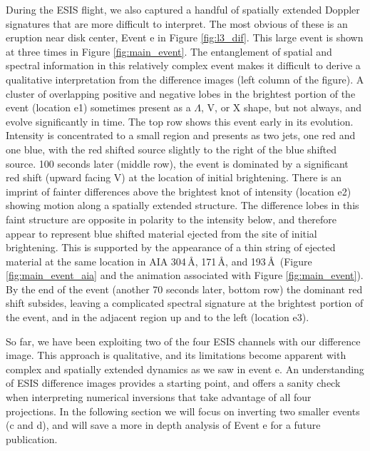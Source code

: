 \documentclass[linenumbers,trackchanges]{aastex63}
\begin{document}
    	During the ESIS flight, we also captured a handful of spatially extended Doppler signatures that are more difficult to interpret.
    	The most obvious of these is an eruption near disk center, Event e in Figure \ref{fig:l3_dif}.
    	This large event is shown at three times in Figure \ref{fig:main_event}.
    	The entanglement of spatial and spectral information in this relatively complex event makes it difficult to derive a qualitative interpretation from the difference images (left column of the figure).
    	A cluster of overlapping positive and negative lobes in the brightest portion of the event (location e1) sometimes present as a $\Lambda$, V, or X shape, but not always, and evolve significantly in time.
    	The top row shows this event early in its evolution. 
    	Intensity is concentrated to a small region and presents as two jets, one red and one blue, with the red shifted source slightly to the right of the blue shifted source. 
    	100 seconds later (middle row), the event is dominated by a significant red shift (upward facing V) at the location of initial brightening. 
    	There is an imprint of fainter differences above the brightest knot of intensity (location e2) showing motion along a spatially extended structure.
    	The difference lobes in this faint structure are opposite in polarity to the intensity below, and therefore appear to represent  blue shifted material ejected from the site of initial brightening.
    	This is supported by the appearance of a thin string of ejected material at the same location in AIA 304\,\AA, 171\,\AA, and 193\,\AA \ (Figure \ref{fig:main_event_aia} and the animation associated with Figure \ref{fig:main_event}).
    	By the end of the event (another 70 seconds later, bottom row) the dominant red shift subsides, leaving a complicated spectral signature at the brightest portion of the event, and in the adjacent region up and to the left (location e3).  
    	
    	So far, we have been exploiting two of the four ESIS channels with our difference image. This approach is qualitative,
    	and its limitations become apparent with complex and spatially extended dynamics as we saw in event e.
    	An understanding of ESIS difference images provides a starting point,
    	and offers a sanity check when interpreting numerical inversions that take advantage of all four projections.
    	In the following section we will focus on inverting two smaller events (c and d), and will save a more in depth analysis of Event e for a future publication. 
    	
\end{document}
